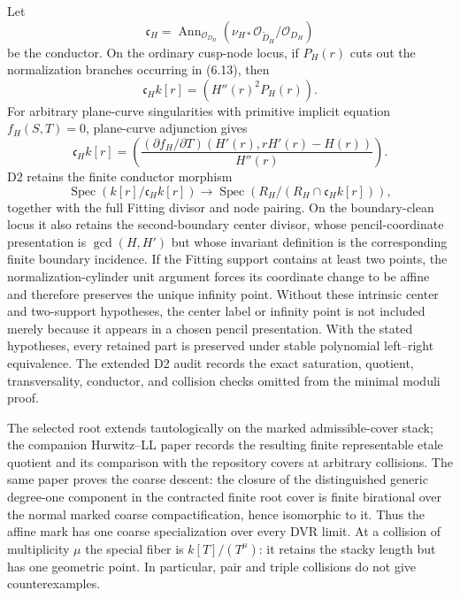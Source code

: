 Let
\[
 \mathfrak c_H=\operatorname{Ann}_{\mathcal O_{D_H}}
 (\nu_{H*}\mathcal O_{\widetilde D_H}/\mathcal O_{D_H}) \tag{6.14}
\]
be the conductor.  On the ordinary cusp-node locus, if $P_H(r)$ cuts out the
normalization branches occurring in (6.13), then
\[
 \mathfrak c_Hk[r]=(H''(r)^2P_H(r)).                   \tag{6.14a}
\]
For arbitrary plane-curve singularities with primitive implicit equation
$f_H(S,T)=0$, plane-curve adjunction gives
\[
 \mathfrak c_Hk[r]=
 \left(
 \frac{(\partial f_H/\partial T)
 (H'(r),rH'(r)-H(r))}{H''(r)}
 \right).                                             \tag{6.14b}
\]
D2 retains the finite conductor morphism
\[
 \operatorname{Spec}(k[r]/\mathfrak c_Hk[r])
 \longrightarrow
 \operatorname{Spec}(R_H/(R_H\cap\mathfrak c_Hk[r])), \tag{6.14c}
\]
together with the full Fitting divisor and node pairing.  On the
boundary-clean locus it also retains the second-boundary center divisor,
whose pencil-coordinate presentation is $\gcd(H,H')$ but whose invariant
definition is the corresponding finite boundary incidence.  If the Fitting
support contains at least two points, the normalization-cylinder unit
argument forces its coordinate change to be affine and therefore preserves
the unique infinity point.  Without these intrinsic center and two-support
hypotheses, the center label or infinity point is not included merely because
it appears in a chosen pencil presentation.  With the stated hypotheses,
every retained part is preserved under stable polynomial left--right
equivalence.  The extended D2 audit records
the exact saturation, quotient, transversality, conductor, and collision
checks omitted from the minimal moduli proof.

\begin{remark}
The selected root extends tautologically on the marked admissible-cover
stack; the companion Hurwitz--LL paper records the resulting finite
representable etale quotient and its comparison with the repository covers
at arbitrary collisions.  The same paper proves the coarse descent: the
closure of the distinguished generic degree-one component in the contracted
finite root cover is finite birational over the normal marked coarse
compactification, hence isomorphic to it.  Thus the affine mark has one
coarse specialization over every DVR limit.  At a collision of multiplicity
$\mu$ the special fiber is $k[T]/(T^\mu)$: it retains the stacky length but
has one geometric point.  In particular, pair and triple collisions do not
give counterexamples.
\end{remark}

